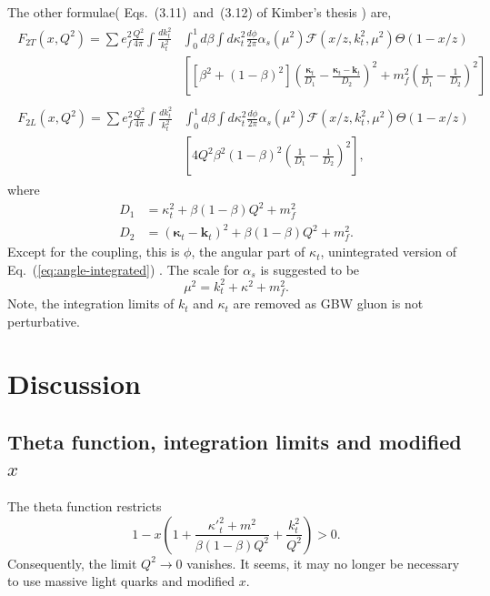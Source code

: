 \documentclass[12pt]{article}
\begin{document}
The other formulae( %
Eqs.~(3.11)~and~(3.12) of Kimber's thesis ) are,
\begin{align}
\begin{split}
F_{2T}(x,Q^2)=\sum e^2_f\frac{Q^2}{4\pi}\int\frac{d k_t^2}{k_t^2}&\int^1_0 d\beta\int d \kappa_t ^2 \frac{d\phi}{2\pi}\alpha_s(\mu^2)\mathcal{F}(x/z,k^2_t,\mu^2)\Theta(1-x/z)\\
&\left[
\left[\beta^2+(1-\beta)^2\right]
\left(\frac{\boldsymbol{\kappa}_t}{D_1}-\frac{\boldsymbol{\kappa}_t-\mathbf{k}_t}{D_2}\right)^2
+m_f^2\left(\frac{1}{D_1}-\frac{1}{D_2}\right)^2
\right]\label{eq:angle-unintegratedT}
\end{split}\\
\begin{split}
F_{2L}(x,Q^2)=\sum e^2_f\frac{Q^2}{4\pi}\int\frac{d k_t^2}{k_t^2}&\int^1_0 d\beta\int d \kappa_t ^2 \frac{d\phi}{2\pi}\alpha_s(\mu^2)\mathcal{F}(x/z,k^2_t,\mu^2)\Theta(1-x/z)\\
&\left[
4Q^2\beta^2 (1-\beta)^2\left(\frac{1}{D_1}-\frac{1}{D_2}\right)^2
\right],\label{eq:angle-unintegratedL}
\end{split}
\end{align}
where
\begin{equation}
\begin{split}
D_1&=\kappa_t^2+\beta(1-\beta)Q^2+m_f^2\\
D_2&=(\boldsymbol{\kappa}_t-\mathbf{k}_t)^2+\beta(1-\beta)Q^2+m_f^2.
\end{split}
\end{equation}
Except for the coupling, this is $\phi$,  the angular part of $\kappa_t$, unintegrated version of Eq.~(\ref{eq:angle-integrated}) .
The scale for $\alpha_s$ is suggested to be 
\begin{equation}
\mu^2=k^2_t+\kappa^2+m_f^2.
\label{eq:scale}
\end{equation}
Note, the integration limits of $k_t$ and $\kappa_t$ are removed as GBW gluon is not perturbative.


\section{Discussion}
\subsection{Theta function, integration limits and modified $x$}
The theta function restricts
\begin{equation}
1-x\left(1+\frac{{\kappa'}_t^2+m^2}{\beta(1-\beta)Q^2}+\frac{k_t^2}{Q^2}\right)>0.
\end{equation}
Consequently, the limit $Q^2\rightarrow0$ vanishes.
It seems, it may no longer be necessary to use massive light quarks and modified $x$.
\end{document}

